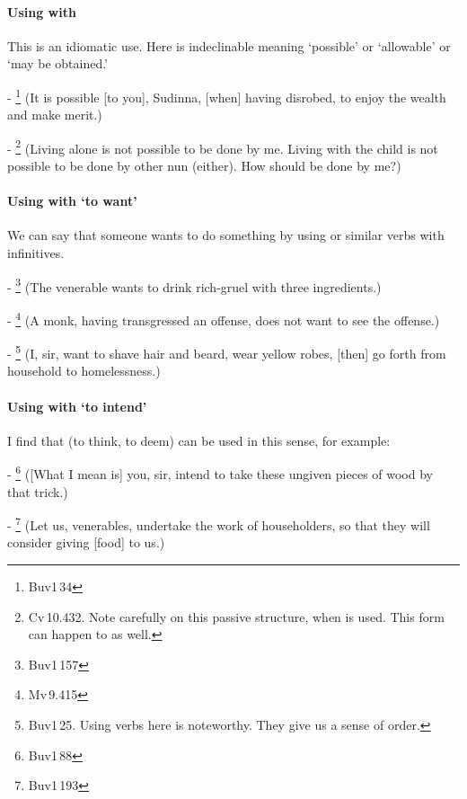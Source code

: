 \paragraph*{Using with } This is an idiomatic use. Here  is indeclinable meaning `possible' or `allowable' or `may be obtained.'\par
- \footnote{Buv1\,34} (It is possible [to you], Sudinna, [when] having disrobed, to enjoy the wealth and make merit.)\par
- \footnote{Cv\,10.432. Note carefully on this passive structure, when  is used. This form can happen to  as well.} (Living alone is not possible to be done by me. Living with the child is not possible to be done by other nun (either). How should be done by me?)\par

\paragraph*{Using with `to want'} We can say that someone wants to do something by using  or similar verbs with infinitives.\par
- \footnote{Buv1\,157} (The venerable wants to drink rich-gruel with three ingredients.)\par
- \footnote{Mv\,9.415} (A monk, having transgressed an offense, does not want to see the offense.)\par
- \footnote{Buv1\,25. Using  verbs here is noteworthy. They give us a sense of order.} (I, sir, want to shave hair and beard, wear yellow robes, [then] go forth from household to homelessness.)\par

\paragraph*{Using with `to intend'} I find that  (to think, to deem) can be used in this sense, for example:\par
- \footnote{Buv1\,88} ([What I mean is] you, sir, intend to take these ungiven pieces of wood by that trick.)\par
- \footnote{Buv1\,193} (Let us, venerables, undertake the work of householders, so that they will consider giving [food] to us.)\par

